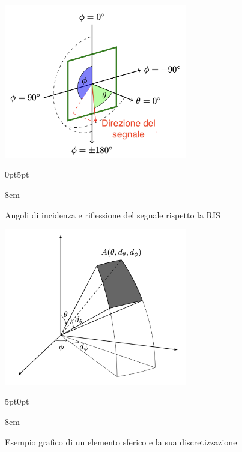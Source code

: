 \begin{figure}[!htbp]
  \begin{minipage}[t]{0.5\linewidth}
    \centering
    \includegraphics[width=8cm]{images/examples/coords.png}
    \begin{adjustwidth}
      {0pt}{5pt}
      \begin{varwidth}
        {8cm}
        \caption{Angoli di incidenza e riflessione del segnale rispetto la RIS\cite{cooperis}}
        \label{fig:coords}
      \end{varwidth}
    \end{adjustwidth}
  \end{minipage}
  \begin{minipage}[t]{0.5\linewidth}
    \centering
    \includegraphics[width=8cm]{images/examples/spherical-element.png}
    \begin{adjustwidth}
      {5pt}{0pt}
      \begin{varwidth}
        {8cm}
        \caption{Esempio grafico di un elemento sferico e la sua
        discretizzazione\cite{cooperis}}
        \label{fig:spherical-elem}
      \end{varwidth}
    \end{adjustwidth}
  \end{minipage}
\end{figure}

